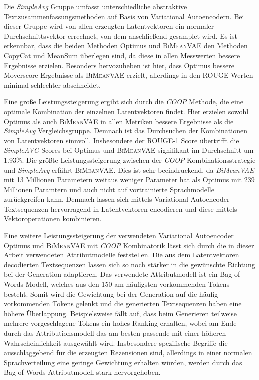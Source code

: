 Die \textit{SimpleAvg} Gruppe umfasst unterschiedliche abstraktive Textzusammenfassungsmethoden auf Basis von Variational Autoencodern.
Bei dieser Gruppe wird von allen erzeugten Latentvektoren ein normaler Durchschnittsvektor errechnet, von dem anschließend gesamplet wird.
Es ist erkennbar, dass die beiden Methoden Optimus und \textsc{BiMeanVAE} den Methoden CopyCat und MeanSum überlegen sind, da diese in allen Messwerten bessere Ergebnisse erzielen.
Besonders hervozuheben ist hier, dass Optimus bessere Moverscore Ergebnisse als \textsc{BiMeanVAE} erzielt, allerdings in den ROUGE Werten minimal schlechter abschneidet. 

Eine große Leistungssteigerung ergibt sich durch die \textit{COOP} Methode, die eine optimale Kombination der einzelnen Latentvektoren findet.
Hier erzielen sowohl Optimus als auch \textsc{BiMeanVAE} in allen Metriken bessere Ergebnisse als die \textit{SimpleAvg} Vergleichsgruppe.
Demnach ist das Durchsuchen der Kombinationen von Latentvektoren sinnvoll. 
Insbesondere der ROUGE-1 Score übertrifft die \textit{SimpleAVG} Scores bei Optimus und \textsc{BiMeanVAE} signifikant im Durchschnitt um 1.93\%.  %
Die größte Leistungssteigerung zwischen der \textit{COOP} Kombinationsstrategie und \textit{SimpleAvg} erfährt \textsc{BiMeanVAE}.
Dies ist sehr beeindruckend, da \textit{BiMeanVAE} mit 13 Millionen Parametern weitaus weniger Parameter hat als Optimus mit 239 Millionen Paramtern und auch nicht auf vortrainierte Sprachmodelle zurückgreifen kann.
Demnach lassen sich mittels Variational Autoencoder Textsequenzen hervorragend in Latentvektoren encodieren und diese mittels Vektoroperationen kombinieren.


Eine weitere Leistungssteigerung der verwendeten Variational Autoencoder Optimus und \textsc{BiMeanVAE} mit \textit{COOP} Kombinatorik lässt sich durch die in dieser Arbeit verwendeten Attributmodelle feststellen.
Die aus dem Latentvektoren decodierten Textsequenzen lassen sich so noch stärker in die gewünschte Richtung bei der Generation adaptieren. 
Das verwendete Attributmodell ist ein Bag of Words Modell, welches aus den 150 am häufigsten vorkommenden Tokens besteht. 
Somit wird die Gewichtung bei der Generation auf die häufig vorkommenden Tokens gelenkt und die generierten Textsequenzen haben eine höhere Überlappung.
Beispielsweise fällt auf, dass beim Generieren teilweise mehrere vorgeschlagene Tokens ein hohes Ranking erhalten, wobei am Ende durch das Attributionsmodell das am besten passende mit einer höheren Wahrscheinlichkeit ausgewählt wird.
Insbesondere spezifische Begriffe die ausschlaggebend für die erzeugten Rezensionen sind, allerdings in einer normalen Sprachverteilung eine geringe Gewichtung erhalten würden, werden durch das Bag of Words Attributmodell stark hervorgehoben.


